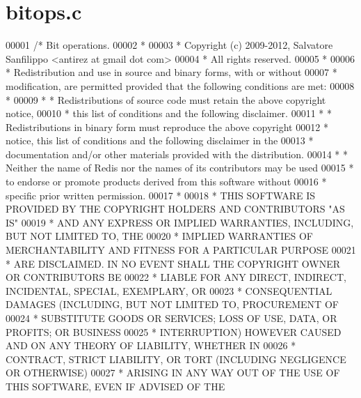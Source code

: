\hypertarget{bitops_8c_source}{}\section{bitops.\+c}
\label{bitops_8c_source}

\begin{DoxyCode}
00001 \textcolor{comment}{/* Bit operations.}
00002 \textcolor{comment}{ *}
00003 \textcolor{comment}{ * Copyright (c) 2009-2012, Salvatore Sanfilippo <antirez at gmail dot com>}
00004 \textcolor{comment}{ * All rights reserved.}
00005 \textcolor{comment}{ *}
00006 \textcolor{comment}{ * Redistribution and use in source and binary forms, with or without}
00007 \textcolor{comment}{ * modification, are permitted provided that the following conditions are met:}
00008 \textcolor{comment}{ *}
00009 \textcolor{comment}{ *   * Redistributions of source code must retain the above copyright notice,}
00010 \textcolor{comment}{ *     this list of conditions and the following disclaimer.}
00011 \textcolor{comment}{ *   * Redistributions in binary form must reproduce the above copyright}
00012 \textcolor{comment}{ *     notice, this list of conditions and the following disclaimer in the}
00013 \textcolor{comment}{ *     documentation and/or other materials provided with the distribution.}
00014 \textcolor{comment}{ *   * Neither the name of Redis nor the names of its contributors may be used}
00015 \textcolor{comment}{ *     to endorse or promote products derived from this software without}
00016 \textcolor{comment}{ *     specific prior written permission.}
00017 \textcolor{comment}{ *}
00018 \textcolor{comment}{ * THIS SOFTWARE IS PROVIDED BY THE COPYRIGHT HOLDERS AND CONTRIBUTORS "AS IS"}
00019 \textcolor{comment}{ * AND ANY EXPRESS OR IMPLIED WARRANTIES, INCLUDING, BUT NOT LIMITED TO, THE}
00020 \textcolor{comment}{ * IMPLIED WARRANTIES OF MERCHANTABILITY AND FITNESS FOR A PARTICULAR PURPOSE}
00021 \textcolor{comment}{ * ARE DISCLAIMED. IN NO EVENT SHALL THE COPYRIGHT OWNER OR CONTRIBUTORS BE}
00022 \textcolor{comment}{ * LIABLE FOR ANY DIRECT, INDIRECT, INCIDENTAL, SPECIAL, EXEMPLARY, OR}
00023 \textcolor{comment}{ * CONSEQUENTIAL DAMAGES (INCLUDING, BUT NOT LIMITED TO, PROCUREMENT OF}
00024 \textcolor{comment}{ * SUBSTITUTE GOODS OR SERVICES; LOSS OF USE, DATA, OR PROFITS; OR BUSINESS}
00025 \textcolor{comment}{ * INTERRUPTION) HOWEVER CAUSED AND ON ANY THEORY OF LIABILITY, WHETHER IN}
00026 \textcolor{comment}{ * CONTRACT, STRICT LIABILITY, OR TORT (INCLUDING NEGLIGENCE OR OTHERWISE)}
00027 \textcolor{comment}{ * ARISING IN ANY WAY OUT OF THE USE OF THIS SOFTWARE, EVEN IF ADVISED OF THE}

\end{DoxyCode}
